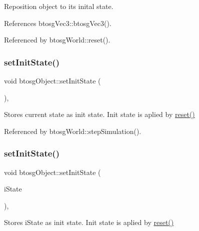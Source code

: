 Reposition object to its inital state. 

References btosg\+Vec3\+::btosg\+Vec3().



Referenced by btosg\+World\+::reset().

\mbox{\label{classbtosgObject_ad1508a0ce28cfac83e5f0ff6245f91b5}} 
\subsubsection{\texorpdfstring{set\+Init\+State()}{setInitState()}\hspace{0.1cm}{\footnotesize\ttfamily [1/2]}}
{\footnotesize\ttfamily void btosg\+Object\+::set\+Init\+State (\begin{DoxyParamCaption}{ }\end{DoxyParamCaption})\hspace{0.3cm}{\ttfamily [inline]}, {\ttfamily [inherited]}}

Stores current state as init state. Init state is aplied by \hyperlink{classbtosgObject_a93983f9180dd0672f8779cf2baa78580}{reset()} 

Referenced by btosg\+World\+::step\+Simulation().

\mbox{\label{classbtosgObject_a6ceb08e59ee95acaaef389ee198d2b56}} 
\subsubsection{\texorpdfstring{set\+Init\+State()}{setInitState()}\hspace{0.1cm}{\footnotesize\ttfamily [2/2]}}
{\footnotesize\ttfamily void btosg\+Object\+::set\+Init\+State (\begin{DoxyParamCaption}\item[{bt\+Transform}]{i\+State }\end{DoxyParamCaption})\hspace{0.3cm}{\ttfamily [inline]}, {\ttfamily [inherited]}}

Stores i\+State as init state. Init state is aplied by \hyperlink{classbtosgObject_a93983f9180dd0672f8779cf2baa78580}{reset()} \mbox{\label{classbtosgObject_a91da93c82d48b86192f0cbb16054fe57}} 
